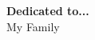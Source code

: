 \thispagestyle{empty}

\vspace*{6.5cm}
 \begin{center}
 \textbf{{{\LARGE{Dedicated to...}}}}\\
 \large{My Family }
 \end{center}
 